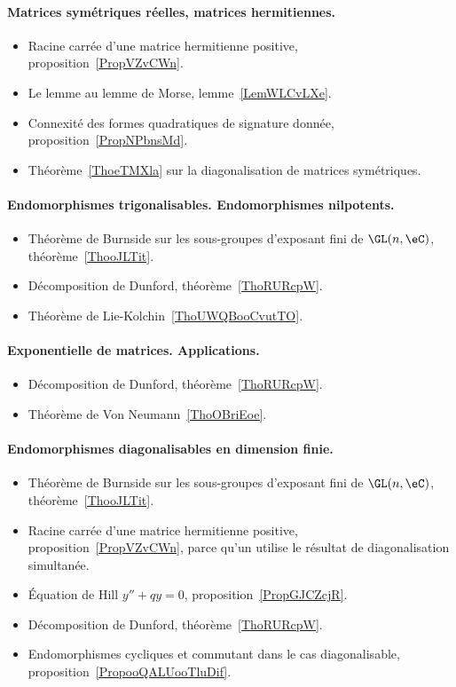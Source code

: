 \paragraph{Matrices symétriques réelles, matrices hermitiennes.}
\begin{itemize}
    \item Racine carrée d'une matrice hermitienne positive, proposition~\ref{PropVZvCWn}.
    \item Le lemme au lemme de Morse, lemme~\ref{LemWLCvLXe}.
    \item Connexité des formes quadratiques de signature donnée, proposition~\ref{PropNPbnsMd}.
    \item Théorème~\ref{ThoeTMXla} sur la diagonalisation de matrices symétriques.
\end{itemize}
\paragraph{Endomorphismes trigonalisables. Endomorphismes nilpotents.}
\begin{itemize}
    \item Théorème de Burnside sur les sous-groupes d'exposant fini de \( \GL(n,\eC)\), théorème~\ref{ThooJLTit}.
    \item Décomposition de Dunford, théorème~\ref{ThoRURcpW}.
    \item Théorème de Lie-Kolchin~\ref{ThoUWQBooCvutTO}.
\end{itemize}
\paragraph{Exponentielle de matrices. Applications.}
\begin{itemize}
    \item Décomposition de Dunford, théorème~\ref{ThoRURcpW}.
    \item Théorème de Von Neumann~\ref{ThoOBriEoe}.
\end{itemize}
\paragraph{Endomorphismes diagonalisables en dimension finie.}
\begin{itemize}
    \item Théorème de Burnside sur les sous-groupes d'exposant fini de \( \GL(n,\eC)\), théorème~\ref{ThooJLTit}.
    \item Racine carrée d'une matrice hermitienne positive, proposition~\ref{PropVZvCWn}, parce qu'un utilise le résultat de diagonalisation simultanée.
    \item Équation de Hill \( y''+qy=0\), proposition~\ref{PropGJCZcjR}.
    \item Décomposition de Dunford, théorème~\ref{ThoRURcpW}.
    \item Endomorphismes cycliques et commutant dans le cas diagonalisable, proposition~\ref{PropooQALUooTluDif}.
\end{itemize}

